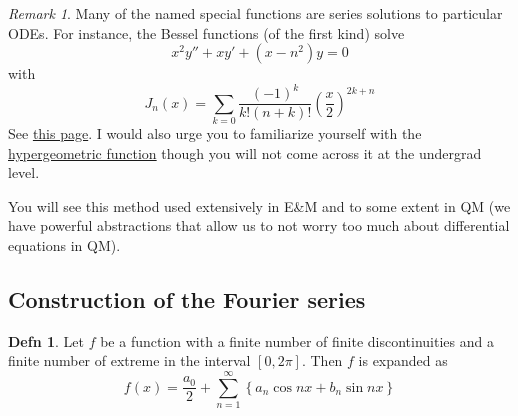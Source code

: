 \documentclass{article}
\theoremstyle{definition}
\newtheorem*{definition}{Defn}
\theoremstyle{remark}
\newtheorem*{remark}{Remark}
\theoremstyle{remark}
\begin{document}
\begin{remark}
	Many of the named special functions are series solutions to particular ODEs. For instance, the Bessel functions (of the first kind) solve
	$$
	x^2y''+xy'+(x-n^2)y=0
	$$
	with
	$$
	J_n(x) = \sum_{k=0}\frac{(-1)^k}{k!(n+k)!}\left(\frac{x}{2}\right)^{2k+n}
	$$
	See \href{https://mathworld.wolfram.com/BesselFunctionoftheFirstKind.html}{this page}. I would also urge you to familiarize yourself with the \href{hypergeometric function}{hypergeometric function} though you will not come across it at the undergrad level.

	You will see this method used extensively in E\&M and to some extent in QM (we have powerful abstractions that allow us to not worry too much about differential equations in QM).
\end{remark}

\subsection*{Construction of the Fourier series}

\begin{definition}
	Let $f$ be a function with a finite number of finite discontinuities and a finite number of extreme in the interval $[0,2\pi]$. Then $f$ is expanded as 
	$$
	f(x) = \frac{a_0}{2}+\sum_{n=1}^\infty\left\{a_n \cos nx+b_n\sin nx \right\}
	$$ 
\end{definition}
\end{document}
